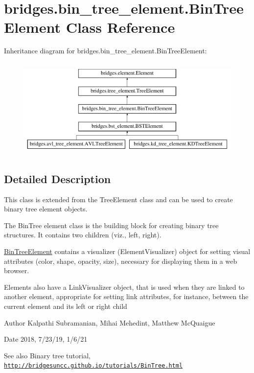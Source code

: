 \hypertarget{classbridges_1_1bin__tree__element_1_1_bin_tree_element}{}\section{bridges.\+bin\+\_\+tree\+\_\+element.\+Bin\+Tree\+Element Class Reference}
\label{classbridges_1_1bin__tree__element_1_1_bin_tree_element}
Inheritance diagram for bridges.\+bin\+\_\+tree\+\_\+element.\+Bin\+Tree\+Element\+:\begin{figure}[H]
\begin{center}
\leavevmode
\includegraphics[height=5.000000cm]{classbridges_1_1bin__tree__element_1_1_bin_tree_element}
\end{center}
\end{figure}


\subsection{Detailed Description}
This class is extended from the Tree\+Element class and can be used to create binary tree element objects. 

The Bin\+Tree element class is the building block for creating binary tree structures. It contains two children (viz., left, right).

\hyperlink{classbridges_1_1bin__tree__element_1_1_bin_tree_element}{Bin\+Tree\+Element} contains a visualizer (Element\+Visualizer) object for setting visual attributes (color, shape, opacity, size), necessary for displaying them in a web browser.

Elements also have a Link\+Visualizer object, that is used when they are linked to another element, appropriate for setting link attributes, for instance, between the current element and its left or right child

\begin{DoxyAuthor}{Author}
Kalpathi Subramanian, Mihai Mehedint, Matthew Mc\+Quaigue
\end{DoxyAuthor}
\begin{DoxyDate}{Date}
2018, 7/23/19, 1/6/21
\end{DoxyDate}
\begin{DoxySeeAlso}{See also}
Binary tree tutorial, \href{http://bridgesuncc.github.io/tutorials/BinTree.html}{\tt http\+://bridgesuncc.\+github.\+io/tutorials/\+Bin\+Tree.\+html} 
\end{DoxySeeAlso}
